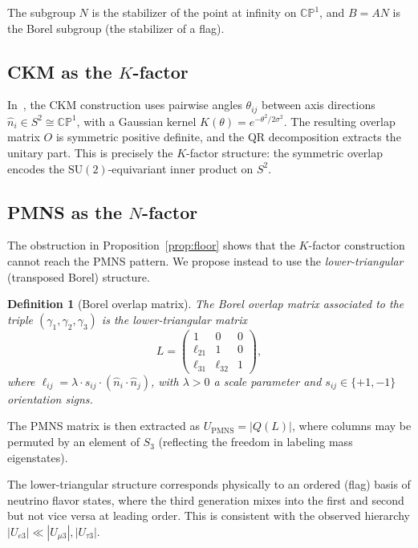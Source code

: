 \documentclass[11pt,a4paper]{article}
\newtheorem{definition}{Definition}
\newcommand{\SUtwo}{\mathrm{SU}(2)}
\newcommand{\CP}{\mathbb{CP}^1}
\begin{document}
The subgroup $N$ is the stabilizer of the point at infinity on $\CP$,
and $B = AN$ is the Borel subgroup (the stabilizer of a flag).

\subsection{CKM as the $K$-factor}

In~\cite{Gentry:CKM}, the CKM construction uses pairwise angles
$\theta_{ij}$ between axis directions $\hat{n}_i \in S^2 \cong \CP$,
with a Gaussian kernel $K(\theta) = e^{-\theta^2/2\sigma^2}$.
The resulting overlap matrix $O$ is symmetric positive definite,
and the QR decomposition extracts the unitary part. This is precisely
the $K$-factor structure: the symmetric overlap encodes the
$\SUtwo$-equivariant inner product on $S^2$.

\subsection{PMNS as the $N$-factor}

The obstruction in Proposition~\ref{prop:floor} shows that the $K$-factor
construction cannot reach the PMNS pattern. We propose instead to use
the \emph{lower-triangular} (transposed Borel) structure.

\begin{definition}[Borel overlap matrix]
\label{def:borel}
The Borel overlap matrix associated to the triple $(\gamma_1, \gamma_2, \gamma_3)$
is the lower-triangular matrix
\begin{equation}
  L = \begin{pmatrix} 1 & 0 & 0 \\ \ell_{21} & 1 & 0 \\ \ell_{31} & \ell_{32} & 1 \end{pmatrix},
  \label{eq:L_matrix}
\end{equation}
where $\ell_{ij} = \lambda \cdot s_{ij} \cdot (\hat{n}_i \cdot \hat{n}_j)$,
with $\lambda > 0$ a scale parameter and $s_{ij} \in \{+1, -1\}$ orientation signs.
\end{definition}

The PMNS matrix is then extracted as $U_\mathrm{PMNS} = |Q(L)|$, where
columns may be permuted by an element of $S_3$ (reflecting the
freedom in labeling mass eigenstates).

The lower-triangular structure corresponds physically to an ordered
(flag) basis of neutrino flavor states, where the third generation
mixes into the first and second but not vice versa at leading order.
This is consistent with the observed hierarchy $|U_{e3}| \ll |U_{\mu3}|,
|U_{\tau 3}|$.
\end{document}
